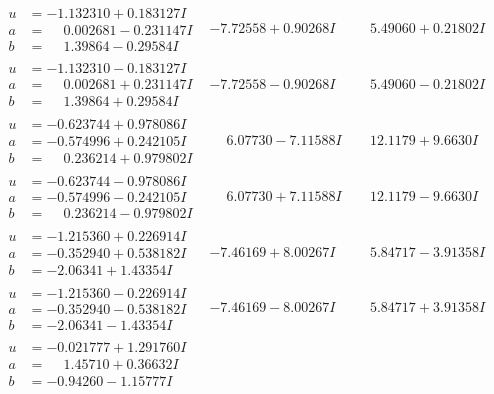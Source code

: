 \documentclass[1p]{elsarticle_modified}
\theoremstyle{definition}
\begin{document}
$$\begin{array}{c|c|c}
\begin{aligned}
u &= -1.132310 + 0.183127 I \\
a &= \phantom{-}0.002681 - 0.231147 I \\
b &= \phantom{-}1.39864 - 0.29584 I\end{aligned}
 & -7.72558 + 0.90268 I & \phantom{-}5.49060 + 0.21802 I \\ \hline\begin{aligned}
u &= -1.132310 - 0.183127 I \\
a &= \phantom{-}0.002681 + 0.231147 I \\
b &= \phantom{-}1.39864 + 0.29584 I\end{aligned}
 & -7.72558 - 0.90268 I & \phantom{-}5.49060 - 0.21802 I \\ \hline\begin{aligned}
u &= -0.623744 + 0.978086 I \\
a &= -0.574996 + 0.242105 I \\
b &= \phantom{-}0.236214 + 0.979802 I\end{aligned}
 & \phantom{-}6.07730 - 7.11588 I & \phantom{-}12.1179 + 9.6630 I \\ \hline\begin{aligned}
u &= -0.623744 - 0.978086 I \\
a &= -0.574996 - 0.242105 I \\
b &= \phantom{-}0.236214 - 0.979802 I\end{aligned}
 & \phantom{-}6.07730 + 7.11588 I & \phantom{-}12.1179 - 9.6630 I \\ \hline\begin{aligned}
u &= -1.215360 + 0.226914 I \\
a &= -0.352940 + 0.538182 I \\
b &= -2.06341 + 1.43354 I\end{aligned}
 & -7.46169 + 8.00267 I & \phantom{-}5.84717 - 3.91358 I \\ \hline\begin{aligned}
u &= -1.215360 - 0.226914 I \\
a &= -0.352940 - 0.538182 I \\
b &= -2.06341 - 1.43354 I\end{aligned}
 & -7.46169 - 8.00267 I & \phantom{-}5.84717 + 3.91358 I \\ \hline\begin{aligned}
u &= -0.021777 + 1.291760 I \\
a &= \phantom{-}1.45710 + 0.36632 I \\
b &= -0.94260 - 1.15777 I\end{aligned}

\end{array}$$
\end{document}
